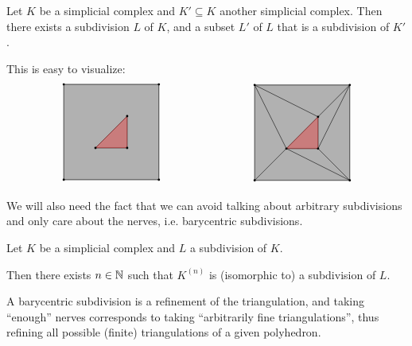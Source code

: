 \begin{lemma} \label{commontr}
    Let $K$ be a simplicial complex and $K'\subseteq K$ another simplicial complex. Then there exists a subdivision $L$ of $K$, and a subset $L'$ of $L$ that is a subdivision of $K'$.
\end{lemma}
This is easy to visualize:
\[\begin{tikzpicture}[scale=1]
  \coordinate (A) at (0.00, 0.00);
  \coordinate (B) at (0.00, 3.00);
  \coordinate (C) at (3.00, 3.00);
  \coordinate (D) at (3.00, 0.00);
  \coordinate (E) at (1.00, 1.00);
  \coordinate (F) at (2.00, 2.00);
  \coordinate (G) at (2.00, 1.00);
  \coordinate (H) at (6.02, -0.02);
  \coordinate (I) at (6.02, 2.98);
  \coordinate (J) at (9.02, 2.98);
  \coordinate (K) at (9.02, -0.02);
  \coordinate (L) at (7.02, 0.98);
  \coordinate (M) at (8.02, 1.98);
  \coordinate (N) at (8.02, 0.98);

  \draw (A) -- (B) -- (C) -- (D) -- cycle;
  \draw[fill, opacity=0.3] (A) -- (B) -- (C) -- (D) -- cycle;
  \draw (E) -- (F) -- (G) -- cycle;
  \draw[red,fill, opacity=0.3] (E) -- (F) -- (G) -- cycle;
  \draw (H) -- (I) -- (J) -- (K) -- cycle;
  \draw[fill, opacity=0.3] (H) -- (I) -- (J) -- (K) -- cycle;
  \draw (L) -- (M) -- (N) -- cycle;
  \draw[red,fill, opacity=0.3]  (L) -- (M) -- (N) -- cycle;
  \draw (H) -- (L);
  \draw (L) -- (K);
  \draw (N) -- (K);
  \draw (N) -- (J);
  \draw (M) -- (J);
  \draw (M) -- (I);
  \draw (L) -- (I);
  \fill[black] (A) circle (1pt);
  \fill[black] (B) circle (1pt);
  \fill[black] (C) circle (1pt);
  \fill[black] (D) circle (1pt);
  \fill[black] (E) circle (1pt);
  \fill[black] (F) circle (1pt);
  \fill[black] (G) circle (1pt);
  \fill[black] (H) circle (1pt);
  \fill[black] (I) circle (1pt);
  \fill[black] (J) circle (1pt);
  \fill[black] (K) circle (1pt);
  \fill[black] (L) circle (1pt);
  \fill[black] (M) circle (1pt);
  \fill[black] (N) circle (1pt);
\end{tikzpicture}\]

We will also need the fact that we can avoid talking about arbitrary subdivisions and only care about the nerves, i.e. barycentric subdivisions.
\begin{lemma} \label{nervesdense}
    Let $K$ be a simplicial complex and $L$ a subdivision of $K$.

    Then there exists $n\in \operatorname{\mathbb{N}}$ such that $K^{(n)}$ is (isomorphic to) a subdivision of $L$.
\end{lemma}
A barycentric subdivision is a refinement of the triangulation, and taking ``enough'' nerves corresponds to taking ``arbitrarily fine triangulations'', thus refining all possible (finite) triangulations of a given polyhedron. 

